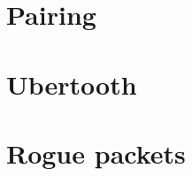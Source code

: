 \documentclass{article}
\begin{document}
\newpage

\vspace*{2\baselineskip} %


{}


\appendix
\section{Pairing}
\label{app:pairing}
\section{Ubertooth}
\label{app:ubertooth}
\section{Rogue packets}
\label{app:roguepackets}

\end{document}

